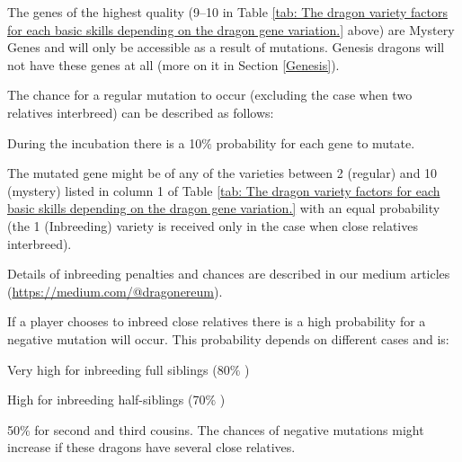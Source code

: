 \documentclass[12pt]{article}
\begin{document}
The genes of the highest quality (9–10 in  Table \ref{tab: The dragon variety factors for each basic skills depending on the dragon gene variation.} above) are Mystery Genes and will only be accessible as a result of mutations. Genesis dragons will not have these genes at all (more on it in Section \ref{Genesis}).\par

The chance for a regular mutation to occur (excluding the case when two relatives interbreed) can be described as follows:\par

\begin{itemize}
  \begin{samepage}
	\item During the incubation there is a 10$\%$  probability for each gene to mutate.\par

	\item The mutated gene might be of any of the varieties between 2 (regular) and 10 (mystery) listed in column 1 of  Table \ref{tab: The dragon variety factors for each basic skills depending on the dragon gene variation.} with an equal probability (the 1 (Inbreeding) variety is received only in the case when close relatives interbreed).\par
  \end{samepage}
\end{itemize}

Details of inbreeding penalties and chances are described in our medium articles (\url{https://medium.com/@dragonereum}). \par

If a player chooses to inbreed close relatives there is a high probability for a negative mutation will occur. This probability depends on different cases and is:\par

\begin{itemize}
  \begin{samepage}
	\item Very high for inbreeding full siblings (80$\%$ )\par

	\item High for inbreeding half-siblings (70$\%$ )\par

	\item 50$\%$  for second and third cousins. The chances of negative mutations might increase if these dragons have several close relatives. 
  \end{samepage}
\end{itemize}\par
\end{document}
